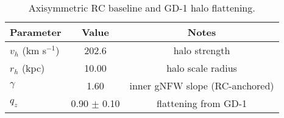 
\begin{table}[t]
\centering
\caption{Axisymmetric RC baseline and GD-1 halo flattening.}
\begin{tabular}{lcc}
\hline
Parameter & Value & Notes \\
\hline
$v_h$ (km s$^{-1}$) & 202.6 & halo strength \\
$r_h$ (kpc)           & 10.00 & halo scale radius \\
$\gamma$              & 1.60 & inner gNFW slope (RC-anchored) \\
$q_z$                 & 0.90 $\pm$ 0.10 & flattening from GD-1 \\
\hline
\end{tabular}
\end{table}
